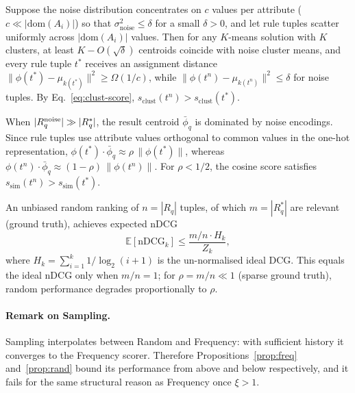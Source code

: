 \begin{proposition}
\label{prop:clust}
Suppose the noise distribution concentrates on $c$ values per attribute
($c \ll |\text{dom}(A_i)|$) so that $\sigma^2_{\mathrm{noise}} \leq \delta$
for a small $\delta > 0$, and let rule tuples scatter uniformly across
$|\text{dom}(A_i)|$ values.  Then for any $K$-means solution with $K$ clusters,
at least $K - O(\sqrt{\delta})$ centroids coincide with noise cluster means, and
every rule tuple $t^*$ receives an assignment distance
$\|{\phi}(t^*) - \mu_{k(t^*)}\|^2 \geq \Omega(1/c)$, while
$\|{\phi}(t^n) - \mu_{k(t^n)}\|^2 \leq \delta$ for noise tuples.
By Eq.~\eqref{eq:clust-score}, $s_{\mathrm{clust}}(t^n) > s_{\mathrm{clust}}(t^*)$.
\end{proposition}

\begin{proposition}
\label{prop:sim}
When $|R_q^{\rm noise}| \gg |R_q^*|$, the result centroid
$\bar{\phi}_q$ is dominated by noise encodings.  Since rule tuples use
attribute values orthogonal to common values in the one-hot representation,
$\phi(t^*) \cdot \bar{\phi}_q \approx \rho\,\|\phi(t^*)\|$, whereas
$\phi(t^n) \cdot \bar{\phi}_q \approx (1-\rho)\,\|\phi(t^n)\|$.  For
$\rho < 1/2$, the cosine score satisfies $s_{\mathrm{sim}}(t^n) > s_{\mathrm{sim}}(t^*)$.
\end{proposition}

\begin{proposition}
\label{prop:rand}
An unbiased random ranking of $n = |R_q|$ tuples, of which $m = |R_q^*|$ are
relevant (ground truth), achieves expected nDCG
\[
  \mathbb{E}[\text{nDCG}_k] \leq \frac{m/n \cdot H_k}{Z_k},
\]
where $H_k = \sum_{i=1}^k 1/\log_2(i+1)$ is the un-normalised ideal DCG.
This equals the ideal nDCG only when $m/n = 1$; for $\rho = m/n \ll 1$
(sparse ground truth), random performance degrades proportionally to $\rho$.
\end{proposition}

\paragraph{Remark on Sampling.}
Sampling interpolates between Random and Frequency: with sufficient history it
converges to the Frequency scorer.  Therefore Propositions~\ref{prop:freq}
and~\ref{prop:rand} bound its performance from above and below respectively,
and it fails for the same structural reason as Frequency once $\xi > 1$.

